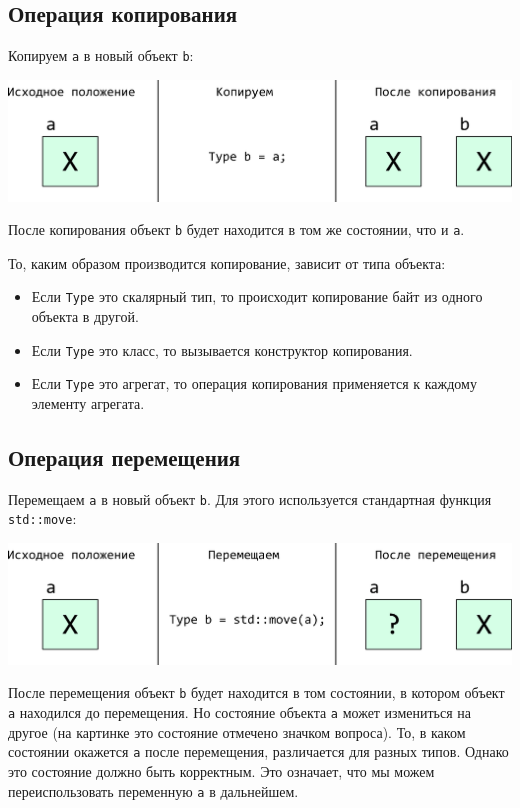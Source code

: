 \documentclass{article}
\begin{document}
\subsection*{Операция копирования}
Копируем \texttt{a} в новый объект \texttt{b}:
\begin{center}
\includegraphics[scale=0.9]{../images/copy.png}
\end{center}
После копирования объект \texttt{b} будет находится в том же состоянии, что и \texttt{a}.

То, каким образом производится копирование, зависит от типа объекта:
\begin{itemize}
\item Если \texttt{Type} это скалярный тип, то происходит копирование байт из одного объекта в другой.
\item Если \texttt{Type} это класс, то вызывается конструктор копирования.
\item Если \texttt{Type} это агрегат, то операция копирования применяется к каждому элементу агрегата.
\end{itemize}



\subsection*{Операция перемещения}
Перемещаем \texttt{a} в новый объект \texttt{b}. Для этого используется стандартная функция \texttt{std::move}:
\begin{center}
\includegraphics[scale=0.9]{../images/move.png}
\end{center}
После перемещения объект \texttt{b} будет находится в том состоянии, в котором объект \texttt{a} находился до перемещения. Но состояние объекта \texttt{a} может измениться на другое (на картинке это состояние отмечено значком вопроса). То, в каком состоянии окажется \texttt{a} после перемещения, различается для разных типов. Однако это состояние должно быть корректным. Это означает, что мы можем переиспользовать переменную \texttt{a} в дальнейшем.
\end{document}

